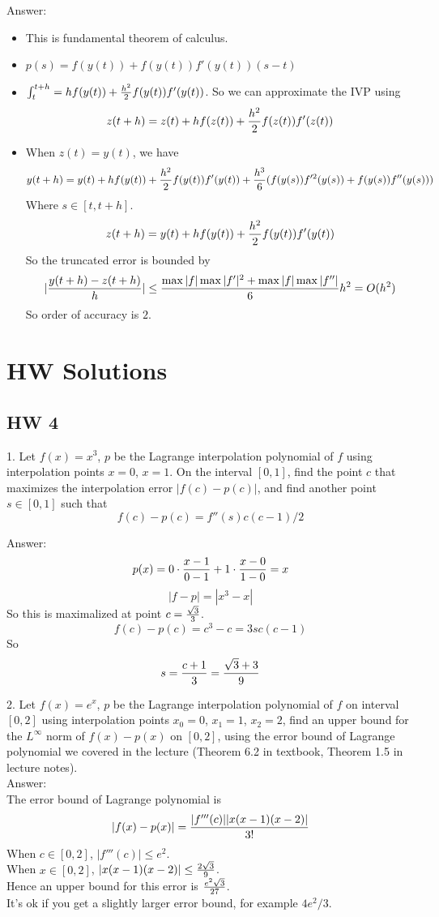 \documentclass{article} %
\theoremstyle{break}
\begin{document}
Answer:
\begin{itemize}
\item This is fundamental theorem of calculus.
\item $p(s)=f(y(t))+f(y(t))f'(y(t))(s-t)$
\item $\int_t^{t+h}=hf(y(t))+{h^2\over 2}f(y(t))f'(y(t))$. So we can approximate the IVP using
  \[z(t+h)=z(t)+hf(z(t))+{h^2\over 2}f(z(t))f'(z(t))\]
\item When $z(t)=y(t)$, we have
  \[y(t+h)=y(t)+hf(y(t))+{h^2\over 2}f(y(t))f'(y(t))+{h^3\over 6}(f(y(s))f'^2(y(s))+f(y(s))f''(y(s)))\]
  Where $s\in [t, t+h]$.
  \[z(t+h)=y(t)+hf(y(t))+{h^2\over 2}f(y(t))f'(y(t))\]
  So the truncated error is bounded by
  \[|{y(t+h)-z(t+h)\over h}|\leq {\max|f|\max|f'|^2+\max|f|\max|f''|\over 6}h^2=O(h^2)\]
  So order of accuracy is $2$.

\end{itemize}

\section{HW Solutions}

\subsection{HW 4}

1. Let $f(x)=x^3$, $p$ be the Lagrange interpolation polynomial of $f$ using interpolation points $x=0$, $x=1$.  On the interval $[0, 1]$, find the point $c$ that maximizes the interpolation error $|f(c)-p(c)|$, and find another point $s\in [0, 1]$ such that
\[f(c)-p(c)=f''(s)c(c-1)/2\]

Answer:\\

\[p(x)=0\cdot{x-1\over 0-1}+1\cdot{x-0\over 1-0}=x\]
\[|f-p|=|x^3-x|\]
So this is maximalized at point $c={\sqrt{3}\over 3}$.
\[f(c)-p(c)=c^3-c=3sc(c-1)\]
So
\[s={c+1\over 3}={\sqrt{3}+3\over 9}\]

2. Let $f(x)=e^x$, $p$ be the Lagrange interpolation polynomial of $f$ on interval $[0, 2]$ using interpolation points $x_0=0$, $x_1=1$, $x_2=2$, find an upper bound for the $L^\infty$ norm of $f(x)-p(x)$ on $[0, 2]$, using the error bound of Lagrange polynomial we covered in the lecture (Theorem 6.2 in textbook, Theorem 1.5 in lecture notes).\\

Answer:\\

The error bound of Lagrange polynomial is
\[|f(x)-p(x)|={|f'''(c)||x(x-1)(x-2)|\over 3!}\]
When $c\in [0, 2]$, $|f'''(c)|\leq e^2$.\\
When $x\in [0, 2]$, $|x(x-1)(x-2)|\leq {2\sqrt{3}\over 9}$.\\
Hence an upper bound for this error is $e^2\sqrt{3}\over 27$.\\
It's ok if you get a slightly larger error bound, for example $4e^2/3$.\\
\end{document}
